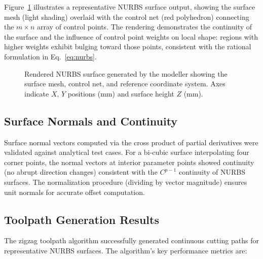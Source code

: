 \documentclass[a4paper,12pt]{article}
\begin{document}
Figure~\ref{fig:surface} illustrates a representative NURBS surface output,
showing the surface mesh (light shading) overlaid with the control net (red
polyhedron) connecting the $m \times n$ array of control points. The rendering
demonstrates the continuity of the surface and the influence of control point
weights on local shape: regions with higher weights exhibit bulging toward
those points, consistent with the rational formulation in Eq.~\eqref{eq:nurbs}.

\begin{figure}[H]
  \centering
  \caption{Rendered NURBS surface generated by the modeller showing the surface
           mesh, control net, and reference coordinate system. Axes indicate
           $X$, $Y$ positions (mm) and surface height $Z$ (mm).}
  \label{fig:surface}
\end{figure}

\subsection{Surface Normals and Continuity}

Surface normal vectors computed via the cross product of partial derivatives
were validated against analytical test cases. For a bi-cubic surface
interpolating four corner points, the normal vectors at interior parameter
points showed continuity (no abrupt direction changes) consistent with the
$C^{p-1}$ continuity of NURBS surfaces. The normalization procedure (dividing
by vector magnitude) ensures unit normals for accurate offset computation.

\subsection{Toolpath Generation Results}

The zigzag toolpath algorithm successfully generated continuous cutting paths
for representative NURBS surfaces. The algorithm's key performance metrics are:
\end{document}
